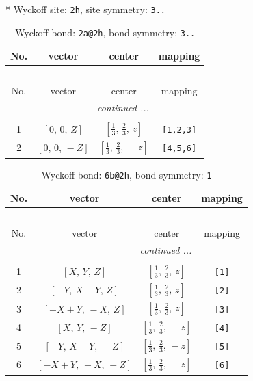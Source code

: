 \documentclass[fleqn,8pt]{jsarticle}
\begin{document}
* Wyckoff site: {\tt 2h}, site symmetry: {\tt 3..}
\renewcommand{\arraystretch}{1.2}
\begin{longtable}{cccc}
\caption{Wyckoff bond: {\tt 2a@2h}, bond symmetry: {\tt 3..}}
 \\
 \hline \hline
No. & vector & center & mapping \\ \hline \endfirsthead

\multicolumn{3}{l}{\tablename\ \thetable{}} \\
 \hline \hline
No. & vector & center & mapping \\ \hline \endhead

 \hline \hline
\multicolumn{3}{r}{\footnotesize\it continued ...} \\ \endfoot

 \hline \hline
\multicolumn{3}{r}{} \\ \endlastfoot

1 & $\left[ 0,\, 0,\, Z \right]$ & $\left[ \frac{1}{3},\, \frac{2}{3},\, z \right]$ & {\tt [1,2,3]} \\ \hline
2 & $\left[ 0,\, 0,\, - Z \right]$ & $\left[ \frac{1}{3},\, \frac{2}{3},\, - z \right]$ & {\tt [4,5,6]} \\
\end{longtable}
\renewcommand{\arraystretch}{1.2}
\begin{longtable}{cccc}
\caption{Wyckoff bond: {\tt 6b@2h}, bond symmetry: {\tt 1}}
 \\
 \hline \hline
No. & vector & center & mapping \\ \hline \endfirsthead

\multicolumn{3}{l}{\tablename\ \thetable{}} \\
 \hline \hline
No. & vector & center & mapping \\ \hline \endhead

 \hline \hline
\multicolumn{3}{r}{\footnotesize\it continued ...} \\ \endfoot

 \hline \hline
\multicolumn{3}{r}{} \\ \endlastfoot

1 & $\left[ X,\, Y,\, Z \right]$ & $\left[ \frac{1}{3},\, \frac{2}{3},\, z \right]$ & {\tt [1]} \\ \hline
2 & $\left[ - Y,\, X - Y,\, Z \right]$ & $\left[ \frac{1}{3},\, \frac{2}{3},\, z \right]$ & {\tt [2]} \\ \hline
3 & $\left[ - X + Y,\, - X,\, Z \right]$ & $\left[ \frac{1}{3},\, \frac{2}{3},\, z \right]$ & {\tt [3]} \\ \hline
4 & $\left[ X,\, Y,\, - Z \right]$ & $\left[ \frac{1}{3},\, \frac{2}{3},\, - z \right]$ & {\tt [4]} \\ \hline
5 & $\left[ - Y,\, X - Y,\, - Z \right]$ & $\left[ \frac{1}{3},\, \frac{2}{3},\, - z \right]$ & {\tt [5]} \\ \hline
6 & $\left[ - X + Y,\, - X,\, - Z \right]$ & $\left[ \frac{1}{3},\, \frac{2}{3},\, - z \right]$ & {\tt [6]} \\
\end{longtable}
\end{document}
